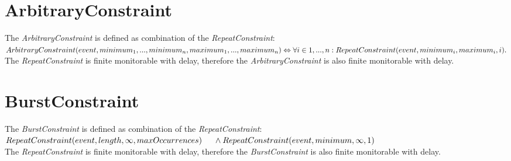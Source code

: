 	
\section{ArbitraryConstraint}
	The \emph{ArbitraryConstraint} is defined as combination of the \emph{RepeatConstraint}:\\[10pt]
	\begin{math}
		ArbitraryConstraint(event, minimum_1, ..., minimum_n, maximum_1, ..., maximum_n)\\
		\Leftrightarrow \forall i\in{1, ..., n}: RepeatConstraint(event, minimum_i, maximum_i, i).
	\end{math}\\[10pt]
	The \emph{RepeatConstraint} is finite monitorable with delay, therefore the \emph{ArbitraryConstraint} is also finite monitorable with delay.
	
\section{BurstConstraint}
	The \emph{BurstConstraint} is defined as combination of the \emph{RepeatConstraint}:\\[10pt]
	\begin{math}
		RepeatConstraint(event, length, \infty, maxOccurrences)\\
		\text{\hspace{.5cm}}\land RepeatConstraint(event, minimum, \infty, 1)
	\end{math}\\[10pt]
	The \emph{RepeatConstraint} is finite monitorable with delay, therefore the \emph{BurstConstraint} is also finite monitorable with delay.
	
